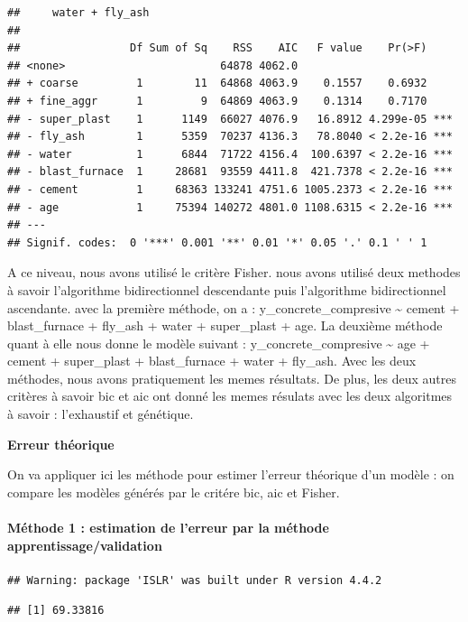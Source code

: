 \documentclass[
  12pt,
]{article}
\begin{document}
\begin{verbatim}
##     water + fly_ash
## 
##                 Df Sum of Sq    RSS    AIC   F value    Pr(>F)    
## <none>                        64878 4062.0                        
## + coarse         1        11  64868 4063.9    0.1557    0.6932    
## + fine_aggr      1         9  64869 4063.9    0.1314    0.7170    
## - super_plast    1      1149  66027 4076.9   16.8912 4.299e-05 ***
## - fly_ash        1      5359  70237 4136.3   78.8040 < 2.2e-16 ***
## - water          1      6844  71722 4156.4  100.6397 < 2.2e-16 ***
## - blast_furnace  1     28681  93559 4411.8  421.7378 < 2.2e-16 ***
## - cement         1     68363 133241 4751.6 1005.2373 < 2.2e-16 ***
## - age            1     75394 140272 4801.0 1108.6315 < 2.2e-16 ***
## ---
## Signif. codes:  0 '***' 0.001 '**' 0.01 '*' 0.05 '.' 0.1 ' ' 1
\end{verbatim}

A ce niveau, nous avons utilisé le critère Fisher. nous avons utilisé
deux methodes à savoir l'algorithme bidirectionnel descendante puis
l'algorithme bidirectionnel ascendante. avec la première méthode, on a :
y\_concrete\_compresive \textasciitilde{} cement + blast\_furnace +
fly\_ash + water + super\_plast + age. La deuxième méthode quant à elle
nous donne le modèle suivant : y\_concrete\_compresive \textasciitilde{}
age + cement + super\_plast + blast\_furnace + water + fly\_ash. Avec
les deux méthodes, nous avons pratiquement les memes résultats. De plus,
les deux autres critères à savoir bic et aic ont donné les memes
résulats avec les deux algoritmes à savoir : l'exhaustif et génétique.

\textbf{Erreur théorique}

On va appliquer ici les méthode pour estimer l'erreur théorique d'un
modèle : on compare les modèles générés par le critére bic, aic et
Fisher.

\paragraph{Méthode 1 : estimation de l'erreur par la méthode
apprentissage/validation}\label{muxe9thode-1-estimation-de-lerreur-par-la-muxe9thode-apprentissagevalidation}

\begin{verbatim}
## Warning: package 'ISLR' was built under R version 4.4.2
\end{verbatim}

\begin{verbatim}
## [1] 69.33816
\end{verbatim}
\end{document}
